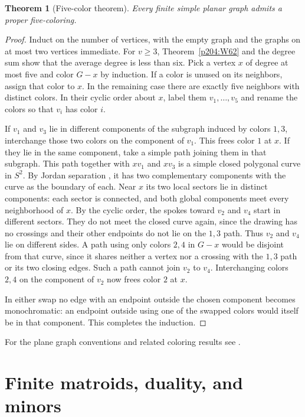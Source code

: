 \documentclass[11pt,oneside,openany]{book}
\theoremstyle{plain}
\newtheorem{theorem}{Theorem}[chapter]
\theoremstyle{definition}
\theoremstyle{remark}
\begin{document}
\begin{theorem}[Five-color theorem]\label{p204:W63}
Every finite simple planar graph admits a proper five-coloring.
\end{theorem}
\begin{proof}
Induct on the number of vertices, with the empty graph and the
graphs on at most two vertices immediate. For \(v\ge3\),
Theorem~\ref{p204:W62} and the degree sum show that the average
degree is less than six. Pick a vertex \(x\) of degree at most
five and color \(G-x\) by induction. If a color is unused on
its neighbors, assign that color to \(x\). In the remaining
case there are exactly five neighbors with distinct colors.
In their cyclic order about \(x\), label them \(v_1,\ldots,v_5\)
and rename the colors so that \(v_i\) has color \(i\).

If \(v_1\) and \(v_3\) lie in different components of the subgraph
induced by colors \(1,3\), interchange those two colors on the
component of \(v_1\). This frees color \(1\) at \(x\). If they
lie in the same component, take a simple path joining them
in that subgraph. This path together with \(xv_1\) and \(xv_3\)
is a simple closed polygonal curve in \(S^2\).
By Jordan separation \cite[Theorem 5.11]{P202}, it has two
complementary components with the curve as the boundary of each.
Near \(x\) its two local sectors lie in distinct components:
each sector is connected, and both global components meet
every neighborhood of \(x\). By the cyclic order, the spokes
toward \(v_2\) and \(v_4\) start in different sectors.
They do not meet the closed curve again, since the drawing
has no crossings and their other endpoints do not lie on the
\(1,3\) path. Thus \(v_2\) and \(v_4\) lie on different sides.
A path using only colors \(2,4\) in \(G-x\) would be disjoint
from that curve, since it shares neither a vertex nor a crossing
with the \(1,3\) path or its two closing edges. Such a path
cannot join \(v_2\) to \(v_4\). Interchanging colors \(2,4\)
on the component of \(v_2\) now frees color \(2\) at \(x\).

In either swap no edge with an endpoint outside the chosen
component becomes monochromatic: an endpoint outside using one
of the swapped colors would itself be in that component.
This completes the induction.
\end{proof}

For the plane graph conventions and related coloring results see
\cite[Chapters 10--11]{BM}\cite[Chapters 4--5]{Diestel}.
\chapter{Finite matroids, duality, and minors}
\label{p204:ch10}
\end{document}

